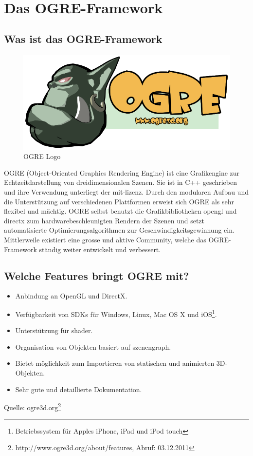 \section{Das OGRE-Framework}

\subsection{Was ist das OGRE-Framework}

\begin{figure}
	\includegraphics[width=1\linewidth]{src/OgreLogo.png}
	\caption{OGRE Logo} %
	\label{OGRE Logo} %
\end{figure}

OGRE (Object-Oriented Graphics Rendering Engine) ist eine Grafikengine zur Echtzeitdarstellung von dreidimensionalen Szenen. Sie ist in C++ geschrieben und ihre Verwendung unterliegt der \gls{mit-lizenz}. Durch den modularen Aufbau und die Unterstützung auf verschiedenen Plattformen erweist sich OGRE als sehr flexibel und mächtig. OGRE selbst benutzt die Grafikbibliotheken \gls{opengl} und \gls{directx} zum hardwarebeschleunigten Rendern der Szenen und setzt automatisierte Optimierungsalgorithmen zur Geschwindigkeitsgewinnung ein. Mittlerweile existiert eine grosse und aktive Community, welche das OGRE-Framework ständig weiter entwickelt und verbessert.

\subsection{Welche Features bringt OGRE mit?}

\begin{itemize}
	\item Anbindung an OpenGL und DirectX.
	\item Verfügbarkeit von SDKs für Windows, Linux, Mac OS X und iOS\footnote{Betriebssystem für Apples iPhone, iPad und iPod touch}.
	\item Unterstützung für \gls{shader}.
	\item Organisation von Objekten basiert auf \gls{szenengraph}.
	\item Bietet möglichkeit zum Importieren von statischen und animierten 3D-Objekten.
	\item Sehr gute und detaillierte Dokumentation.
\end{itemize}
Quelle: ogre3d.org\footnote{http://www.ogre3d.org/about/features, Abruf: 03.12.2011}

